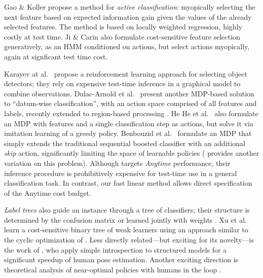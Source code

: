 Gao \& Koller \parencite{Gao-NIPS-2011} propose a method for \emph{active classification}: myopically selecting the next feature based on expected information gain given the values of the already selected features.
The method is based on locally weighted regression, highly costly at test time.
Ji \& Carin \parencite{Ji-PR-2007} also formulate cost-sensitive feature selection generatively, as an HMM conditioned on actions, but select actions myopically, again at signficant test time cost.

Karayev at al.\ \parencite{Karayev-NIPS-2012} propose a reinforcement learning approach for selecting object detectors; they rely on expensive test-time inference in a graphical model to combine observations.
Dulac-Arnold et al.\ \parencite{DulacArnold-ML-2012} present another MDP-based solution to ``datum-wise classification'', with an action space comprised of all features and labels, recently extended to region-based processing \parencite{DulacArnold-ICLR-2014}.
He He et al.\ \parencite{HeHe-ICMLW-2012} also formulate an MDP with features and a single classification step as actions, but solve it via imitation learning of a greedy policy.
Benbouzid et al.\ \parencite{Benbouzid-ICML-2012} formulate an MDP that simply extends the traditional sequential boosted classifier with an additional \emph{skip} action, significantly limiting the space of learnable policies (\parencite{Trapeznikov-ML-2012} provides another variation on this problem).
Although \parencite{Karayev-NIPS-2012} targets \emph{Anytime} performance, their inference procedure is prohibitively expensive for test-time use in a general classification task.
In contrast, our fast linear method allows direct specification of the Anytime cost budget.

\emph{Label trees} also guide an instance through a tree of classifiers; their structure is determined by the confusion matrix or learned jointly with weights \parencite{Deng-NIPS-2011}.
Xu et al.\ \parencite{Xu-ICML-2013} learn a cost-sensitive binary tree of weak learners using an approach similar to the cyclic optimization of \parencite{Chen-AISTATS-2012}.
Less directly related---but exciting for its novelty---is the work of \parencite{Weiss-ICCV-2013}, who apply simple introspection to structured models for a significant speedup of human pose estimation.
Another exciting direction is theoretical analysis of near-optimal policies with humans in the loop \parencite{Chen-2014-ICML}.
